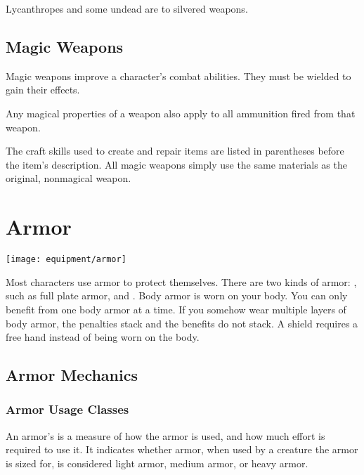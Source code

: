          Lycanthropes and some undead are  to silvered weapons.

\begin{longcolumn}
\section{Magic Weapons}
\begin{longtablepreface}

    Magic weapons improve a character's combat abilities.
    They must be wielded to gain their effects.

     Any magical properties of a  weapon also apply to all ammunition fired from that weapon.

     The craft skills used to create and repair items are listed in parentheses before the item's description.
    All magic weapons simply use the same materials as the original, nonmagical weapon.
\end{longtablepreface}

    

\end{longcolumn}

    

\newpage
\section{Armor}\label{Armor}
    \texttt{[image: equipment/armor]}

    Most characters use armor to protect themselves. There are two kinds of armor: , such as full plate armor, and .
    Body armor is worn on your body.
    You can only benefit from one body armor at a time.
    If you somehow wear multiple layers of body armor, the penalties stack and the benefits do not stack.
    A shield requires a free hand instead of being worn on the body.

    \subsection{Armor Mechanics}

        \subsubsection{Armor Usage Classes}\label{Armor Usage Classes}
            An armor's  is a measure of how the armor is used, and how much effort is required to use it.
            It indicates whether armor, when used by a creature the armor is sized for, is considered light armor, medium armor, or heavy armor.

